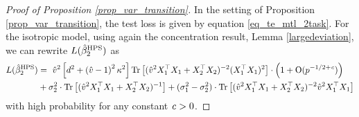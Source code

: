 \begin{proof}[Proof of Proposition \ref{prop_var_transition}]
In the setting of Proposition \ref{prop_var_transition}, the test loss is given by equation \eqref{eq_te_mtl_2task}.
For the isotropic model, using again the concentration result, Lemma \ref{largedeviation}, we can rewrite $L(\hat{\beta}_2^{\textup{HPS}})$ as
\begin{align*}
	L(\hat{\beta}_2^{\textup{HPS}}) &=~ \hat{v}^2 \left[d^2 +\left( \hat v-1\right)^2\kappa^2\right]\operatorname{Tr}\left[ (\hat{v}^2 X_1^{\top}X_1 + X_2^{\top}X_2)^{-2} (X_1^{\top}X_1)^2\right] \cdot \left(1+\operatorname{O}(p^{-1/2+{\mathit{c}}})\right)\nonumber \\
	& + \sigma_2^2 \cdot \operatorname{Tr}\left[(\hat{v}^2 X_1^{\top}X_1 + X_2^{\top}X_2)^{-1} \right] + (\sigma_1^2 -\sigma_2^2)  \cdot \operatorname{Tr}\left[(\hat{v}^2 X_1^{\top}X_1 + X_2^{\top}X_2)^{-2} \hat v^2X_1^\top X_1\right]
\end{align*}
with high probability for any constant ${\mathit{c}}>0$.




\end{proof}

